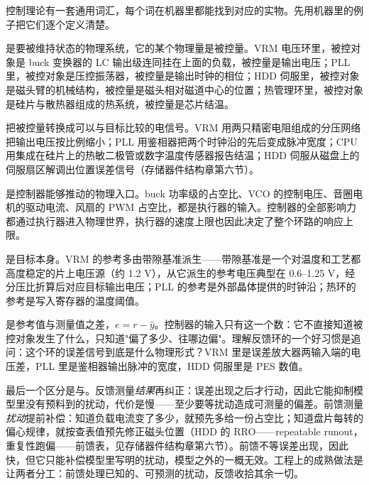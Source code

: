 
控制理论有一套通用词汇，每个词在机器里都能找到对应的实物。先用机器里的例子把它们逐个定义清楚。

是要被维持状态的物理系统，它的某个物理量是被控量。VRM 电压环里，被控对象是 buck 变换器的 LC 输出级连同挂在上面的负载，被控量是输出电压；PLL 里，被控对象是压控振荡器，被控量是输出时钟的相位；HDD 伺服里，被控对象是磁头臂的机械结构，被控量是磁头相对磁道中心的位置；热管理环里，被控对象是硅片与散热器组成的热系统，被控量是芯片结温。

把被控量转换成可以与目标比较的电信号。VRM 用两只精密电阻组成的分压网络把输出电压按比例缩小；PLL 用鉴相器把两个时钟沿的先后变成脉冲宽度；CPU 用集成在硅片上的热敏二极管或数字温度传感器报告结温；HDD 伺服从磁盘上的伺服扇区解调出位置误差信号（存储器件结构章第六节）。

是控制器能够推动的物理入口。buck 功率级的占空比、VCO 的控制电压、音圈电机的驱动电流、风扇的 PWM 占空比，都是执行器的输入。控制器的全部影响力都通过执行器进入物理世界，执行器的速度上限也因此决定了整个环路的响应上限。

是目标本身。VRM 的参考多由带隙基准派生——带隙基准是一个对温度和工艺都高度稳定的片上电压源（约 1.2 V），从它派生的参考电压典型在 0.6--1.25 V，经分压比折算后对应目标输出电压；PLL 的参考是外部晶体提供的时钟沿；热环的参考是写入寄存器的温度阈值。

是参考值与测量值之差，$e = r - \hat{y}$。控制器的输入只有这一个数：它不直接知道被控对象发生了什么，只知道"偏了多少、往哪边偏"。理解反馈环的一个好习惯是追问：这个环的误差信号到底是什么物理形式？VRM 里是误差放大器两输入端的电压差，PLL 里是鉴相器输出脉冲的宽度，HDD 伺服里是 PES 数值。

最后一个区分是与。反馈测量\emph{结果}再纠正：误差出现之后才行动，因此它能抑制模型里没有预料到的扰动，代价是慢——至少要等扰动造成可测量的偏差。前馈测量\emph{扰动}提前补偿：知道负载电流变了多少，就预先多给一份占空比；知道盘片每转的偏心规律，就按查表值预先修正磁头位置（HDD 的 RRO——repeatable runout，重复性跑偏——前馈表，见存储器件结构章第六节）。前馈不等误差出现，因此快，但它只能补偿模型里写明的扰动，模型之外的一概无效。工程上的成熟做法是让两者分工：前馈处理已知的、可预测的扰动，反馈收拾其余一切。

